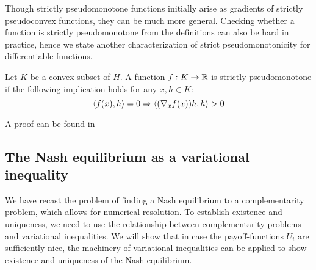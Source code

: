 Though strictly pseudomonotone functions initially arise as gradients of strictly pseudoconvex functions, they can be much more general. Checking whether a function is strictly pseudomonotone from the definitions can also be hard in practice, hence we state another characterization of strict pseudomonotonicity for differentiable functions.
  \begin{lemma}
  \label{lem:strict_pm}
  Let $K$ be a convex subset of $H$. A function $f: K \to \mathbb{R}$ is strictly pseudomonotone if the following implication holds for any $x,h \in K$:
  \begin{equation}
    \left \langle f(x),h \right \rangle = 0 \Rightarrow \left \langle (\nabla_x f(x))h,h \right \rangle > 0
  \end{equation}
\end{lemma}
A proof can be found in \citep[Proposition 2.8, p.96]{hadjisavvas2006handbook}


\subsection{The Nash equilibrium as a variational inequality}
We have recast the problem of finding a Nash equilibrium to a complementarity problem, which allows for numerical resolution. To establish existence and uniqueness, we need to use the relationship between complementarity problems and variational inequalities. We will show that in case the payoff-functions $U_i $ are sufficiently nice, the machinery of variational inequalities can be applied to show existence and uniqueness of the Nash equilibrium.

